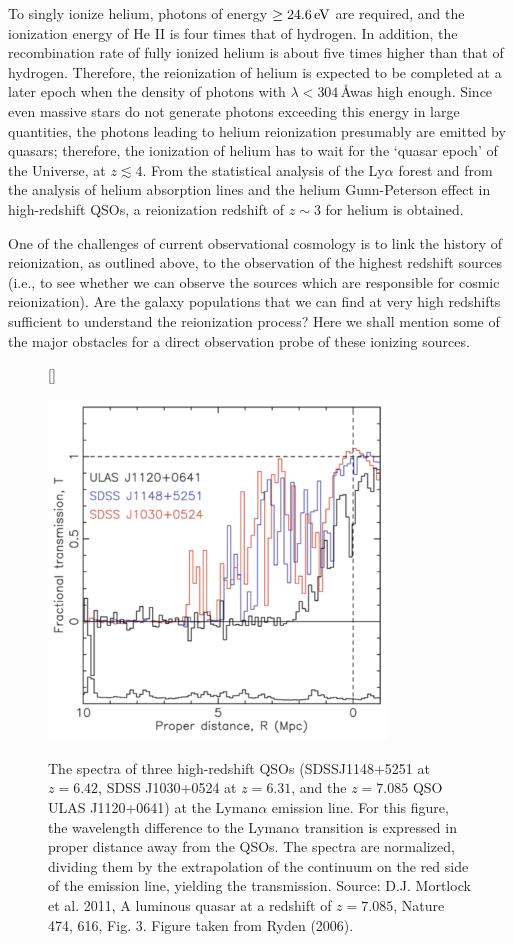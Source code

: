 \documentclass[a4paper,11pt]{article}
\begin{document}
{\noindent}To singly ionize helium, photons of energy $\geq24.6\,{\rm eV}$ are required, and the ionization energy of He II is four times that of hydrogen. In addition, the recombination rate of fully ionized helium is about five times higher than that of hydrogen. Therefore, the reionization of helium is expected to be completed at a later epoch when the density of photons with $\lambda<304$\,\AA was high enough. Since even massive stars do not generate photons exceeding this energy in large quantities, the photons leading to helium reionization presumably are emitted by quasars; therefore, the ionization of helium has to wait for the `quasar epoch' of the Universe, at $z\lesssim4$. From the statistical analysis of the Ly$\alpha$ forest and from the analysis of helium absorption lines and the helium Gunn-Peterson effect in high-redshift QSOs, a reionization redshift of $z\sim3$ for helium is obtained.

{\noindent}One of the challenges of current observational cosmology is to link the history of reionization, as outlined above, to the observation of the highest redshift sources (i.e., to see whether we can observe the sources which are responsible for cosmic reionization). Are the galaxy populations that we can find at very high redshifts sufficient to understand the reionization process? Here we shall mention some of the major obstacles for a direct observation probe of these ionizing sources.

\begin{figure}[t]
    [\FBwidth]
    {\caption{\footnotesize{The spectra of three high-redshift QSOs (SDSSJ1148+5251 at $z=6.42$, SDSS J1030+0524 at $z=6.31$, and the $z=7.085$ QSO ULAS J1120+0641) at the Lyman$\alpha$ emission line. For this figure, the wavelength difference to the Lyman$\alpha$ transition is expressed in proper distance away from the QSOs. The spectra are normalized, dividing them by the extrapolation of the continuum on the red side of the emission line, yielding the transmission. Source: D.J. Mortlock et al. 2011, A luminous quasar at a redshift of $z=7.085$, Nature 474, 616, Fig. 3. Figure taken from Ryden (2006).}}
    \label{fig:qsoreionization}}
    {\includegraphics[width=9cm]{figures/QSOreionization.png}}
\end{figure}
\end{document}
